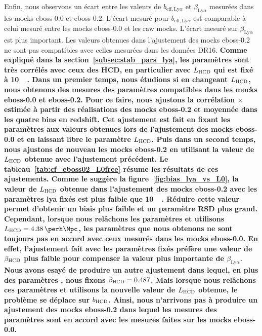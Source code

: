 \documentclass[11pt, twoside, a4paper, openright]{report}
\begin{document}
Enfin, nous observons un écart entre les valeurs de $b_{\mathrm{eff},\mathrm{Ly}\alpha}$ et $\beta_{\mathrm{Ly}\alpha}$ mesurées dans les mocks eboss-0.0 et eboss-0.2. L'écart mesuré pour $b_{\mathrm{eff},\mathrm{Ly}\alpha}$ est comparable à celui mesuré entre les mocks eboss-0.0 et les raw mocks.
L'écart mesuré sur $\beta_{\mathrm{Ly}\alpha}$ est plus important. Les valeurs obtenues dans l'ajustement des mocks eboss-0.2 ne sont pas compatibles avec celles mesurées dans les données DR16.
\textbf{Comme expliqué dans la section~\ref{subsec:stab_pars_lya}, les paramètres \lya{} sont très corrélés avec ceux des HCD, en particulier avec $L_{\textsc{HCD}}$ qui est fixé à \SI{10}{\perh\Mpc}.
Dans un premier temps, nous étudions si en changeant $L_{\textsc{HCD}}$, nous obtenons des mesures des paramètres \lya{} compatibles dans les mocks eboss-0.0 et eboss-0.2.
Pour ce faire, nous ajustons la corrélation \lya{}$\times$\lya{} estimée à partir des \Nmocks{} réalisations des mocks eboss-0.2 et moyennée dans les quatre bins en redshift.
Cet ajustement est fait en fixant les paramètres \lya{} aux valeurs obtenues lors de l'ajustement des mocks eboss-0.0 et en laissant libre le paramètre $L_{\textsc{HCD}}$.
Puis dans un second temps, nous ajustons de nouveau les mocks eboss-0.2 en utilisant la valeur de $L_{\textsc{HCD}}$ obtenue avec l'ajustement précédent.
Le tableau~\ref{tab:cf_eboss02_L0free} résume les résultats de ces ajustements.
Comme le suggère la figure~\ref{fig:bias_lya_vs_L0}, la valeur de $L_{\textsc{HCD}}$ obtenue dans l'ajustement des mocks eboss-0.2 avec les paramètres lya{} fixés est plus faible que \SI{10}{\perh\Mpc}. Réduire cette valeur permet d'obtenir un biais \lya{} plus faible et un paramètre RSD \lya{} plus grand.
Cependant, lorsque nous relâchons les paramètres \lya{} et utilisons $L_{\textsc{HCD}} = \SI{4.38}{\perh\Mpc}$, les paramètres \lya{} que nous obtenons ne sont toujours pas en accord avec ceux mesurés dans les mocks eboss-0.0.
En effet, l'ajustement fait avec les paramètres \lya{} fixés préfère une valeur de $\beta_{\textsc{HCD}}$ plus faible pour compenser la valeur plus importante de $\beta_{\mathrm{Ly}\alpha}$.
Nous avons esayé de produire un autre ajustement dans lequel, en plus des paramètres \lya{}, nous fixons $\beta_{\textsc{HCD}} = \num{0.487}$. Mais lorsque nous relâchons ces paramètres et utilisons la nouvelle valeur de $L_{\textsc{HCD}}$ obtenue, le problème se déplace sur $b_{\textsc{HCD}}$.
Ainsi, nous n'arrivons pas à produire un ajustement des mocks eboss-0.2 dans lequel les mesures des paramètres \lya{} sont en accord avec les mesures faites sur les mocks eboss-0.0.}
\end{document}
